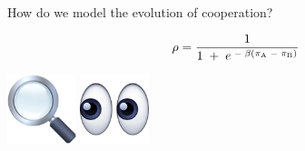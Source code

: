 \documentclass{beamer}
\begin{document}
\begin{frame}
    \centering
    \Large{How do we model the evolution of cooperation?}
\end{frame}

\begin{frame}
    \centering
    
\end{frame}

\begin{frame}
    \centering
    
\end{frame}

\begin{frame}
    \centering
    
\end{frame}

\begin{frame}
    \centering
    
\end{frame}

\begin{frame}
    \centering
    
\end{frame}

\begin{frame}
    \centering
    \Large{$$\rho = \frac{1}{1 \; + \; e^{\; - \; \beta (\pi _{{\rm A}}\; - \; \pi _{{\rm B}})}}$$}
\end{frame}

\begin{frame}
    \begin{center}
    \includegraphics[width=0.15\textwidth]{static/magnifying_glass.png}\hspace{8pt}
    \includegraphics[width=0.15\textwidth]{static/eyes.png}
    \end{center}
\end{frame}
\end{document}
